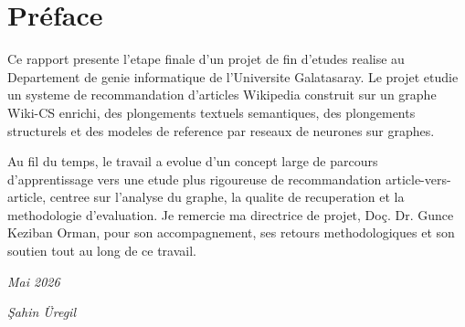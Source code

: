 \chapter{Préface}

Ce rapport presente l'etape finale d'un projet de fin d'etudes realise au
Departement de genie informatique de l'Universite Galatasaray. Le projet etudie
un systeme de recommandation d'articles Wikipedia construit sur un graphe
Wiki-CS enrichi, des plongements textuels semantiques, des plongements
structurels et des modeles de reference par reseaux de neurones sur graphes.

Au fil du temps, le travail a evolue d'un concept large de parcours
d'apprentissage vers une etude plus rigoureuse de recommandation
article-vers-article, centree sur l'analyse du graphe, la qualite de
recuperation et la methodologie d'evaluation. Je remercie ma directrice de
projet, Doç. Dr. Gunce Keziban Orman, pour son accompagnement, ses retours
methodologiques et son soutien tout au long de ce travail.

\bigskip
\hfill \textit{Mai 2026} \hspace{1cm}

\hfill \textit{Şahin Üregil}
